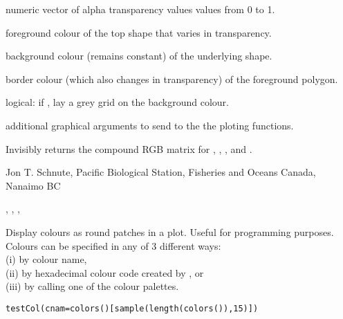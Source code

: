 \documentclass[letterpaper]{book}
\begin{document}
\begin{Arguments}
\begin{ldescription}
\item[\code{alpha}]  numeric vector of alpha transparency values values from 0 to 1. 
\item[\code{fg}]  foreground colour of the top shape that varies in transparency. 
\item[\code{bg}]  background colour (remains constant) of the underlying shape. 
\item[\code{border}]  border colour (which also changes in transparency) of the foreground polygon. 
\item[\code{grid}]  logical: if , lay a grey grid on the background colour. 
\item[\code{...}]  additional graphical arguments to send to the the ploting functions. 
\end{ldescription}
\end{Arguments}
%
\begin{Value}
Invisibly returns the compound RGB matrix for , , 
, and .
\end{Value}
%
\begin{Author}\relax
Jon T. Schnute, Pacific Biological Station, Fisheries and Oceans Canada, Nanaimo BC
\end{Author}
%
\begin{SeeAlso}\relax
 , , ,  
\end{SeeAlso}
%
\begin{Description}\relax
Display colours as round patches in a plot. Useful for programming purposes. 
Colours can be specified in any of 3 different ways: \\{}
(i) by colour name, \\{}
(ii) by hexadecimal colour code created by , or \\{}
(iii) by calling one of the colour palettes.
\end{Description}
%
\begin{Usage}
\begin{verbatim}
testCol(cnam=colors()[sample(length(colors()),15)])
\end{verbatim}
\end{Usage}
\end{document}
